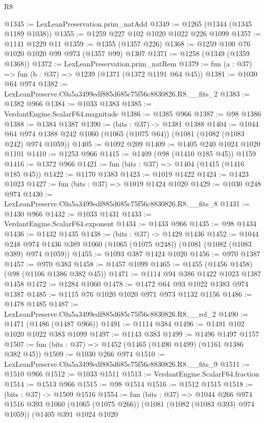 \begin{lexlean}{R8}
\begin{coremodule}
@1345 := LexLeanPreservation.prim_natAdd
@1349 := @1265 (@1344 (@1345 @1189 @1038))
@1355 := @1259 @227 @102 @1020 @1022 @226 @1099
@1357 := @1141 @1229 @11
@1359 := @1355 (@1357 @226)
@1368 := @1259 @100 @76 @1020 @1020 @99 @973 (@1357 @99) @1307
@1371 := @1258 (@1349 (@1359 @1368))
@1372 := LexLeanPreservation.prim_natRem
@1379 := fun (a : @37) => fun (b : @37) => @1239 (@1371 (@1372 @1191 @64 @45))
@1381 := @1030 @64 @974
@1382 := LexLeanPreserve.C0a5a3499edf885d685c75f56c8830826.R8.__fits_2
@1383 := @1382 @966
@1384 := @1033 @1383
@1385 := VerdantEngine.ScalarF64.magnitude
@1386 := @1385 @966
@1387 := @98 @1386
@1388 := @1384 @1387
@1390 := (bits : @37) -> @1381 @1388
@1404 := @1044 @64 @974 @1388 @242 @1060 (@1065 (@1075 @64)) (@1081 (@1082 (@1083 @242) @974 @1059))
@1405 := @1092 @209
@1409 := @1405 @240 @1024 @1020 @1101
@1410 := @1253 @966
@1415 := @1409 (@98 (@1410 @185 @45)) @1159
@1416 := @1372 @966
@1421 := fun (bits : @37) => @1404 (@1415 (@1416 @185 @45))
@1422 := @1170 @1383
@1423 := @1019 @1422
@1424 := @1423 @1023
@1427 := fun (bits : @37) => @1019 @1424 @1020
@1429 := @1030 @248 @974
@1430 := LexLeanPreserve.C0a5a3499edf885d685c75f56c8830826.R8.__fits_8
@1431 := @1430 @966
@1432 := @1033 @1431
@1433 := VerdantEngine.ScalarF64.exponent
@1434 := @1433 @966
@1435 := @98 @1434
@1436 := @1432 @1435
@1438 := (bits : @37) -> @1429 @1436
@1452 := @1044
    @248
    @974
    @1436
    @389
    @1060
    (@1065 (@1075 @248))
    (@1081 (@1082 (@1083 @389) @974 @1059))
@1455 := @1093 @387 @1424 @1020
@1456 := @970 @1387
@1457 := @970 @383
@1458 := @1457 @1099
@1465 := @1455 (@1456 @1458) (@98 (@1106 @1386 @382 @45))
@1471 := @1114 @94 @386 @1422 @1023 @1387 @1458
@1472 := @1284 @1060
@1478 := @1472 @64 @93 @1022 @1383 @974 @1387
@1485 := @1115 @76 @1020 @1020 @971 @973 @1132 @1156
@1486 := @1478 @1485
@1487 := LexLeanPreserve.C0a5a3499edf885d685c75f56c8830826.R8.__rel_2
@1490 := @1471 (@1486 (@1487 @966))
@1491 := @1114 @384
@1496 := @1491 @102 @1020 @1022 @383 @1099
@1497 := @1143 @383
@1499 := @1496 @1497 @1157
@1507 := fun (bits : @37) => @1452 (@1465 (@1490 @1499) (@1161 @1386 @382 @45))
@1509 := @1030 @266 @974
@1510 := LexLeanPreserve.C0a5a3499edf885d685c75f56c8830826.R8.__fits_9
@1511 := @1510 @966
@1512 := @1033 @1511
@1513 := VerdantEngine.ScalarF64.fraction
@1514 := @1513 @966
@1515 := @98 @1514
@1516 := @1512 @1515
@1518 := (bits : @37) -> @1509 @1516
@1554 := fun (bits : @37) =>
  @1044
    @266
    @974
    @1516
    @393
    @1060
    (@1065 (@1075 @266))
    (@1081 (@1082 (@1083 @393) @974 @1059))
    (@1405
      @391
      @1024
      @1020

\end{coremodule}
\end{lexlean}
